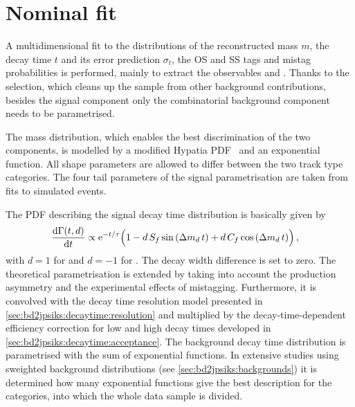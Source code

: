 
\section{Nominal fit}
\label{sec:bd2jpsiks:nominalfit}

A multidimensional fit to the distributions of the reconstructed mass $m$,
the decay time $t$ and its error prediction $\sigma_t$, the OS and SS\pion
tags and mistag probabilities is performed, mainly to extract the \CP
observables \SJpsiKS and \CJpsiKS. Thanks to the selection, which cleans up
the sample from other background contributions, besides the signal component
only the combinatorial background component needs to be parametrised.

The mass distribution, which enables the best discrimination of the two
components, is modelled by a modified Hypatia PDF~\cite{Santos:2013ky} and an
exponential function. All shape parameters are allowed to differ between the two
track type categories. The four tail parameters of the signal parametrisation
are taken from fits to simulated events.

The PDF describing the signal decay time distribution is basically given by
\begin{equation}
\begin{aligned}
  \frac{\mathrm{d}\Gamma(t,d)}{\mathrm{d}t}
  &\propto \mathrm{e}^{-t/\tau}
    \Big(
      1
      - d\, \Sf \sin{\left(\dmd\,t\right)}
      + d\, \Cf \cos{\left(\dmd\,t\right)}
    \Big)\,,
\end{aligned}
\label{eq:simpledecayrates}
\end{equation}
with $d = \num{+1}$ for \Bd and $d = \num{-1}$ for \Bdb. The decay width
difference \DGd is set to zero. The theoretical parametrisation is extended by
taking into account the production asymmetry and the experimental effects of
mistagging. Furthermore, it is convolved with the decay time resolution model
presented in \cref{sec:bd2jpsiks:decaytime:resolution} and multiplied by the
decay-time-dependent efficiency correction for low and high decay times developed in
\cref{sec:bd2jpsiks:decaytime:acceptance}. The background decay time
distribution is parametrised with the sum of exponential functions.
In extensive studies using sweighted background distributions (see
\cref{sec:bd2jpsiks:backgrounds}) it is determined how many exponential
functions give the best description for the categories, into which the whole
data sample is divided.

